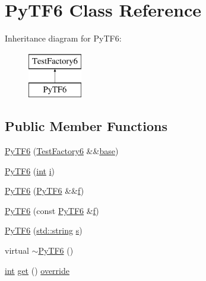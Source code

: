 \hypertarget{class_py_t_f6}{}\section{Py\+T\+F6 Class Reference}
\label{class_py_t_f6}
Inheritance diagram for Py\+T\+F6\+:\begin{figure}[H]
\begin{center}
\leavevmode
\includegraphics[height=2.000000cm]{class_py_t_f6}
\end{center}
\end{figure}
\subsection*{Public Member Functions}
\begin{DoxyCompactItemize}
\item 
\mbox{\hyperlink{class_py_t_f6_a925d4ed5318f5036af87ec3052094a24}{Py\+T\+F6}} (\mbox{\hyperlink{class_test_factory6}{Test\+Factory6}} \&\&\mbox{\hyperlink{structbase}{base}})
\item 
\mbox{\hyperlink{class_py_t_f6_a6138b61504d441db737c420b2a4fb393}{Py\+T\+F6}} (\mbox{\hyperlink{warnings_8h_a74f207b5aa4ba51c3a2ad59b219a423b}{int}} \mbox{\hyperlink{abstract_8h_a13235ab5ddf5c2ccd5ca35ab01d91328}{i}})
\item 
\mbox{\hyperlink{class_py_t_f6_a191168d1c8e9880cd01aab1752d7842a}{Py\+T\+F6}} (\mbox{\hyperlink{class_py_t_f6}{Py\+T\+F6}} \&\&\mbox{\hyperlink{_s_d_l__opengl__glext_8h_a691492ec0bd6383f91200e49f6ae40ed}{f}})
\item 
\mbox{\hyperlink{class_py_t_f6_a59ff12d3204bb7a8fa9817a652a12245}{Py\+T\+F6}} (const \mbox{\hyperlink{class_py_t_f6}{Py\+T\+F6}} \&\mbox{\hyperlink{_s_d_l__opengl__glext_8h_a691492ec0bd6383f91200e49f6ae40ed}{f}})
\item 
\mbox{\hyperlink{class_py_t_f6_a7ad5f3313a226dde45122bc920f4adc9}{Py\+T\+F6}} (\mbox{\hyperlink{_s_d_l__opengl__glext_8h_ab4ccfaa8ab0e1afaae94dc96ef52dde1}{std\+::string}} \mbox{\hyperlink{_s_d_l__opengl_8h_a4af680a6c683f88ed67b76f207f2e6e4}{s}})
\item 
virtual \mbox{\hyperlink{class_py_t_f6_a96a9b5a6a50afedfe88f875b5a612061}{$\sim$\+Py\+T\+F6}} ()
\item 
\mbox{\hyperlink{warnings_8h_a74f207b5aa4ba51c3a2ad59b219a423b}{int}} \mbox{\hyperlink{class_py_t_f6_ae98e91c8c1c7533878f3970158b9b0b7}{get}} () \mbox{\hyperlink{dictobject_8h_a055cf4fd16bde9bce026127362cee1a3}{override}}
\end{DoxyCompactItemize}
